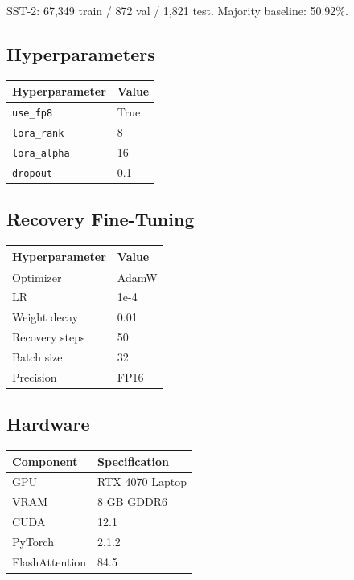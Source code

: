 SST-2: 67,349 train / 872 val / 1,821 test. Majority baseline: 50.92\%.

\subsection{Hyperparameters}

\begin{table}[H]
\centering
\small
\begin{tabular}{ll}
\toprule
\textbf{Hyperparameter} & \textbf{Value} \\
\midrule
\texttt{use\_fp8} & True \\
\texttt{lora\_rank} & 8 \\
\texttt{lora\_alpha} & 16 \\
\texttt{dropout} & 0.1 \\
\bottomrule
\end{tabular}
\end{table}

\subsection{Recovery Fine-Tuning}

\begin{table}[H]
\centering
\small
\begin{tabular}{ll}
\toprule
\textbf{Hyperparameter} & \textbf{Value} \\
\midrule
Optimizer & AdamW \\
LR & 1e-4 \\
Weight decay & 0.01 \\
Recovery steps & 50 \\
Batch size & 32 \\
Precision & FP16 \\
\bottomrule
\end{tabular}
\end{table}

\subsection{Hardware}

\begin{table}[H]
\centering
\small
\begin{tabular}{ll}
\toprule
\textbf{Component} & \textbf{Specification} \\
\midrule
GPU & RTX 4070 Laptop \\
VRAM & 8 GB GDDR6 \\
CUDA & 12.1 \\
PyTorch & 2.1.2 \\
FlashAttention & 84.5 \\
\bottomrule
\end{tabular}
\end{table}

